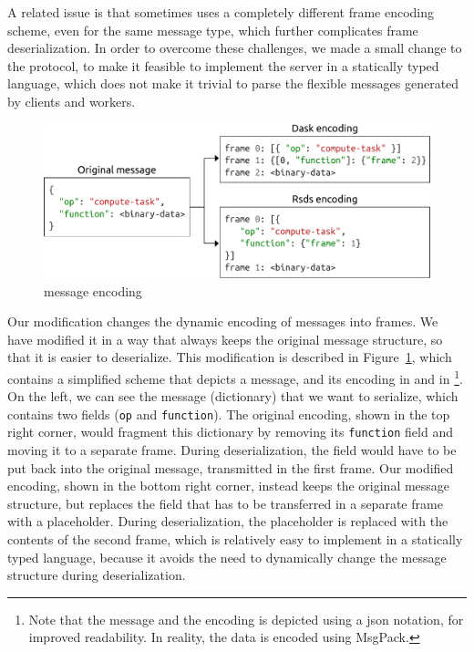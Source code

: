 A related issue is that \dask{} sometimes uses a completely different frame
encoding scheme, even for the same message type, which further complicates frame deserialization.
In order to overcome these challenges, we made a small change to the \dask{}
protocol, to make it feasible to implement the server in a statically typed language, which does
not make it trivial to parse the flexible messages generated by \dask{} clients
and workers.

\begin{figure}
	\centering
	\includegraphics[width=0.9\columnwidth]{./imgs/rsds/frame-encoding}
	\caption{\dask{} message encoding}
	\label{fig:rsds-dask-frame-encoding}
\end{figure}

Our modification changes the dynamic encoding of \dask{} messages into frames.
We have modified it in a way that always keeps the original message structure, so that it is easier
to deserialize. This modification is described in Figure~\ref{fig:rsds-dask-frame-encoding}, which
contains a simplified scheme that depicts a \dask{} message, and its encoding
in \dask{} and in \rsds{}\footnote{Note that the message and the encoding is depicted using a \gls{json}
notation, for improved readability. In reality, the data is encoded using MsgPack.}. On
the left, we can see the message (dictionary) that we want to serialize, which contains two fields
(\texttt{op} and \texttt{function}). The original
\dask{} encoding, shown in the top right corner, would fragment this dictionary
by removing its \texttt{function} field and moving it to a separate frame. During
deserialization, the field would have to be put back into the original message, transmitted in the
first frame. Our modified encoding, shown in the bottom right corner, instead keeps the original
message structure, but replaces the field that has to be transferred in a separate frame with a
placeholder. During deserialization, the placeholder is replaced with the contents of the second
frame, which is relatively easy to implement in a statically typed language, because it avoids the
need to dynamically change the message structure during deserialization.


